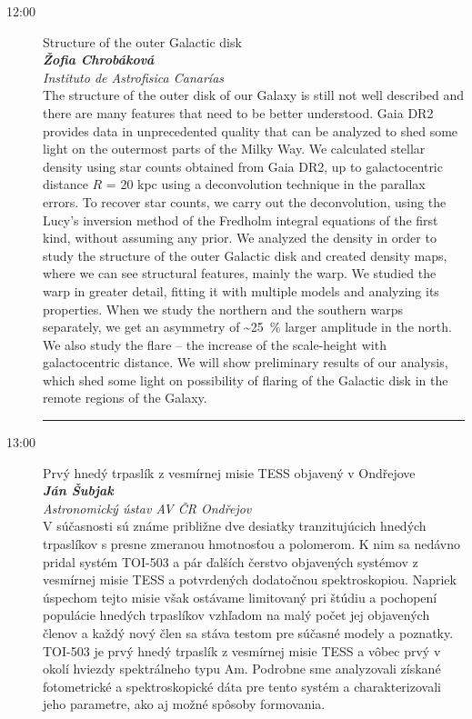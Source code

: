 \documentclass[a4paper]{report}
\begin{document}
\begin{description}
                            \item[12:00]
                    {\Large Structure of the outer Galactic disk} \\[1ex]
                                            \textit{\textbf{Žofia Chrobáková}} \\%
                                        \textit{Instituto de Astrofisica Canarías} \\[1ex]                    The structure of the outer disk of our Galaxy is still not well described and there are many features that need to be better understood. Gaia DR2 provides data in unprecedented quality that can be analyzed to shed some light on the outermost parts of the Milky Way. We calculated stellar density using star counts obtained from Gaia DR2, up to galactocentric distance $R$ = 20 kpc using a deconvolution technique in the parallax errors. To recover star counts, we carry out the deconvolution, using the Lucy's inversion method of the Fredholm integral equations of the first kind, without assuming any prior. We analyzed the density in order to study the structure of the outer Galactic disk and created density maps, where we can see structural features, mainly the warp. We studied the warp in greater detail, fitting it with multiple models and analyzing its properties. When we study the northern and the southern warps separately, we get an asymmetry of \textasciitilde\SI{25}{\percent} larger amplitude in the north. We also study the flare -- the increase of the scale-height with galactocentric distance. We will show preliminary results of our analysis, which shed some light on possibility of flaring of the Galactic disk in the remote regions of the Galaxy.
 \\                    \rule{\paperwidth}{0.4pt}
                            \item[13:00]
                    {\Large Prvý hnedý trpaslík z vesmírnej misie TESS objavený v Ondřejove} \\[1ex]
                                            \textit{\textbf{Ján Šubjak}} \\%
                                        \textit{Astronomický ústav AV ČR Ondřejov} \\[1ex]                    V súčasnosti sú známe približne dve desiatky tranzitujúcich hnedých trpaslíkov s presne zmeranou hmotnosťou a polomerom. K nim sa nedávno pridal systém TOI-503 a pár ďalších čerstvo objavených systémov z vesmírnej misie TESS a potvrdených dodatočnou spektroskopiou. Napriek úspechom tejto misie však ostávame limitovaný pri štúdiu a pochopení populácie hnedých trpaslíkov vzhľadom na malý počet jej objavených členov a každý nový člen sa stáva testom pre súčasné modely a poznatky. TOI-503 je prvý hnedý trpaslík z vesmírnej misie TESS a vôbec prvý v okolí hviezdy spektrálneho typu Am. Podrobne sme analyzovali získané fotometrické a spektroskopické dáta pre tento systém a charakterizovali jeho parametre, ako aj možné spôsoby formovania.

\end{description}
\end{document}
